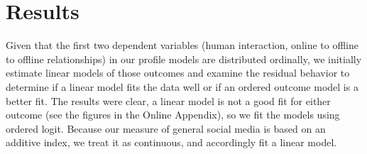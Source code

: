 \documentclass[]{interact}
\theoremstyle{plain}%
\theoremstyle{definition}
\theoremstyle{remark}
\begin{document}
\section{Results}\label{results}

Given that the first two dependent variables (human interaction, online
to offline to offline relationships) in our profile models are
distributed ordinally, we initially estimate linear models of those
outcomes and examine the residual behavior to determine if a linear
model fits the data well or if an ordered outcome model is a better fit.
The results were clear, a linear model is not a good fit for either
outcome (see the figures in the Online Appendix), so we fit the models
using ordered logit. Because our measure of general social media is
based on an additive index, we treat it as continuous, and accordingly
fit a linear model.

\begin{table}

\caption{\label{tbl-profile-models}Modeling Profiles of Digital
Communication}


\end{table}%
\end{document}
